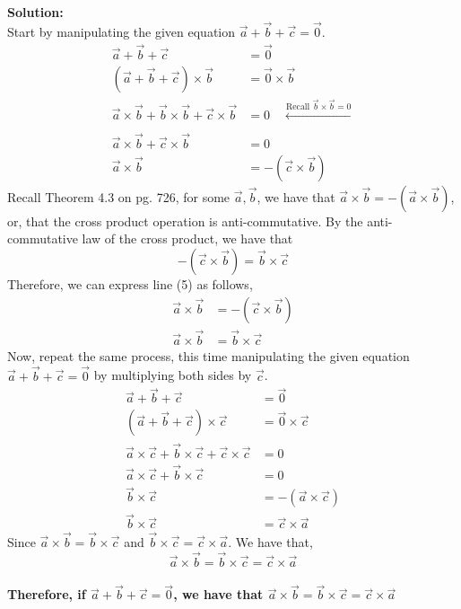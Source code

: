 \documentclass[12pt]{book}
\begin{document}
\begin{enumerate}
\setcounter{equation}{0}
\textbf{Solution:}\\
Start by manipulating the given equation $\vec{a}+\vec{b}+\vec{c}=\vec{0}$.
\begin{align}
    \vec{a}+\vec{b}+\vec{c} &= \vec{0} \\
    (\vec{a}+\vec{b}+\vec{c}) \times \vec{b} &= \vec{0} \times \vec{b} \\
    \vec{a}\times\vec{b} + \vec{b}\times\vec{b} + \vec{c}\times\vec{b} &= 0 \quad \xleftarrow[]{\text{Recall } \vec{b} \times \vec{b} = 0}\\
    \vec{a}\times\vec{b} + \vec{c}\times\vec{b} &= 0 \\
    \vec{a}\times\vec{b} &= -(\vec{c}\times\vec{b})
\end{align}
Recall Theorem 4.3 on pg. 726, for some $\vec{a},\vec{b}$, we have that $\vec{a}\times\vec{b} = -(\vec{a}\times\vec{b})$, or, that the cross product operation is anti-commutative. By the anti-commutative law of the cross product, we have that
$$-(\vec{c}\times\vec{b}) = \vec{b}\times\vec{c}$$
Therefore, we can express line (5) as follows,
\begin{align}
    \vec{a}\times\vec{b} &= -(\vec{c}\times\vec{b}) \\
    \vec{a}\times\vec{b} &= \vec{b}\times\vec{c}
\end{align}
Now, repeat the same process, this time manipulating the given equation $\vec{a}+\vec{b}+\vec{c}=\vec{0}$ by multiplying both sides by $\vec{c}$.
\begin{align}
    \vec{a}+\vec{b}+\vec{c} &= \vec{0} \\
    (\vec{a}+\vec{b}+\vec{c}) \times \vec{c} &= \vec{0} \times \vec{c} \\
    \vec{a}\times\vec{c} + \vec{b}\times\vec{c} + \vec{c}\times\vec{c} &= 0 \\
    \vec{a}\times\vec{c} + \vec{b}\times\vec{c} &= 0 \\
    \vec{b}\times\vec{c} &= -(\vec{a}\times\vec{c}) \\
    \vec{b}\times\vec{c} &= \vec{c}\times\vec{a}
\end{align}
Since $\vec{a}\times\vec{b} = \vec{b}\times\vec{c}$ and $\vec{b}\times\vec{c} = \vec{c}\times\vec{a}$. We have that, $$\vec{a}\times\vec{b} = \vec{b}\times\vec{c} = \vec{c}\times\vec{a}$$\\

\textbf{Therefore, if $\vec{a}+\vec{b}+\vec{c}=\vec{0}$, we have that $\vec{a}\times\vec{b} = \vec{b}\times\vec{c} = \vec{c}\times\vec{a}$}



\end{enumerate}
\end{document}
